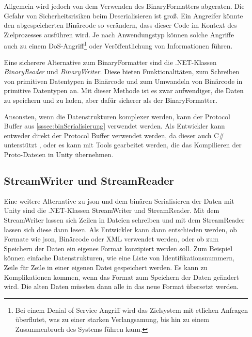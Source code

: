Allgemein wird jedoch von dem Verwenden des BinaryFormatters abgeraten. Die Gefahr von Sicherheitsrisiken beim Deserialisieren ist groß. Ein Angreifer könnte den abgespeicherten Binärcode so verändern, dass dieser Code im Kontext des Zielprozesses ausführen wird. Je nach Anwendungstyp können solche Angriffe auch zu einem DoS-Angriff\footnote{Bei einem Denial of Service Angriff wird das Zielsystem mit etlichen Anfragen überflutet, was zu einer starken Verlangsamung, bis hin zu einem Zusammenbruch des Systems führen kann.\cite{bundDoSDDoSAttacken}} oder Veröffentlichung von Informationen führen.\cite{microsoftDeserializationRisks}

Eine sicherere Alternative zum BinaryFormatter sind die .NET-Klassen \textit{BinaryReader} und \textit{BinaryWriter}. Diese bieten Funktionalitäten, zum Schreiben von primitiven Datentypen in Binärcode und zum Umwandeln von Binärcode in primitive Datentypen an. Mit dieser Methode ist es zwar aufwendiger, die Daten zu speichern und zu laden, aber dafür sicherer als der BinaryFormatter.\cite{microsoftBinaryReaderClass}\cite{microsoftBinaryWriterClass} 

Ansonsten, wenn die Datenstrukturen komplexer werden, kann der Protocol Buffer aus \ref{sssec:binSerialisierung} verwendet werden. Als Entwickler kann entweder direkt der Protocol Buffer verwendet werden, da dieser auch C\# unterstützt \cite{protobufLanguageGuide}, oder es kann mit Tools gearbeitet werden, die das Kompilieren der Proto-Dateien in Unity übernehmen.\cite{githubProtobufUnity}



\subsection{StreamWriter und StreamReader}
Eine weitere Alternative zu \ac{json} und dem binären Serialisieren der Daten mit Unity sind die .NET-Klassen StreamWriter und StreamReader. Mit dem StreamWriter lassen sich Zeilen in Dateien schreiben und mit dem StreamReader lassen sich diese dann lesen.\cite{microsoftStreamWriterKlasse}\cite{microsoftStreamReaderKlasse} Als Entwickler kann dann entschieden werden, ob Formate wie \ac{json}, Binärcode oder XML verwendet werden, oder ob zum Speichern der Daten ein eigenes Format konzipiert werden soll. Zum Beispiel können einfache Datenstrukturen, wie eine Liste von Identifikationsnummern, Zeile für Zeile in einer eigenen Datei gespeichert werden. Es kann zu Komplikationen kommen, wenn das Format zum Speichern der Daten geändert wird. Die alten Daten müssten dann alle in das neue Format übersetzt werden.



